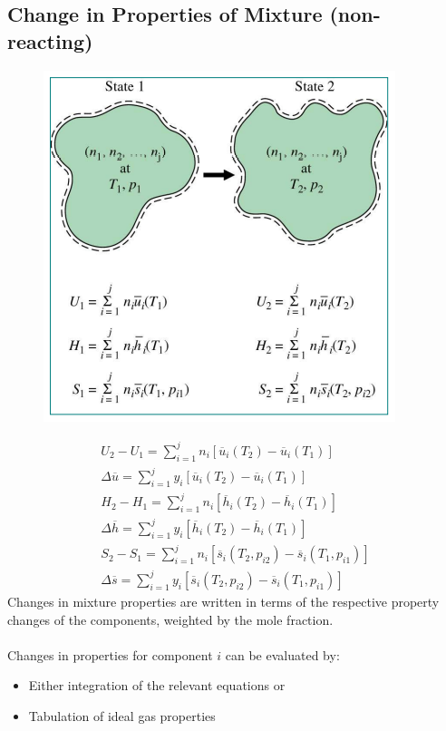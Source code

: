 \documentclass[class=report, crop=false, 12pt,a4paper]{standalone}
\begin{document}
\subsection{Change in Properties of Mixture (non-reacting)}
\begin{figure}[H]
  \centering
  \includegraphics[width = 0.45 \textwidth]{../img/diagram97.png}
  \caption{}
\end{figure}
\begin{gather}
  U_2 - U_1 = \sum_{i=1}^{j}n_i\left[\overline{u}_i(T_2) - \overline{u}_i(T_1)\right] \\[5pt]
  \Delta\overline{u} = \sum_{i=1}^{j}y_i\left[\overline{u}_i(T_2) - \overline{u}_i(T_1)\right] \\[15pt]
  H_2 - H_1 = \sum_{i=1}^{j}n_i\left[\overline{h}_i(T_2) - \overline{h}_i(T_1)\right] \\[5pt]
  \Delta\overline{h} = \sum_{i=1}^{j}y_i\left[\overline{h}_i(T_2) - \overline{h}_i(T_1)\right] \\[15pt]
  S_2 - S_1 = \sum_{i=1}^{j}n_i\left[\overline{s}_i(T_2,p_{i2}) - \overline{s}_i(T_1,p_{i1})\right] \\[5pt]
  \Delta\overline{s} = \sum_{i=1}^{j}y_i\left[\overline{s}_i(T_2,p_{i2}) - \overline{s}_i(T_1,p_{i1})\right]
\end{gather}
Changes in mixture properties are written in terms of the respective property changes of the components, weighted by the mole fraction. \\\\
Changes in properties for component $i$ can be evaluated by:
\begin{itemize}[noitemsep]
  \item Either integration of the relevant equations or
  \item Tabulation of ideal gas properties 
\end{itemize}
\end{document}
